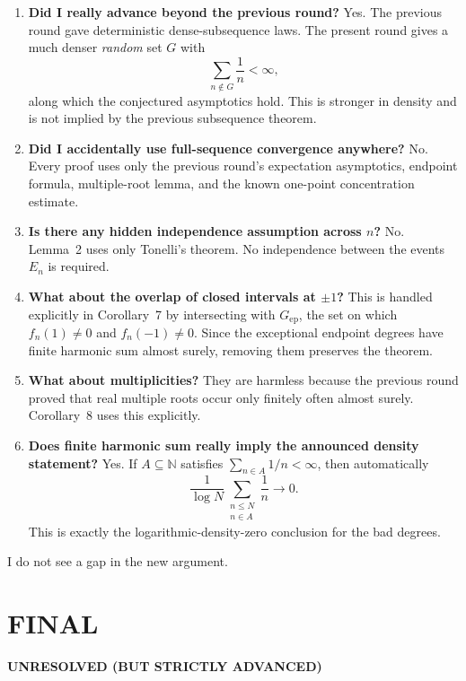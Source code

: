 \begin{enumerate}
\item \textbf{Did I really advance beyond the previous round?} Yes. The previous round gave deterministic dense-subsequence laws. The present round gives a much denser \emph{random} set $G$ with
\[
\sum_{n\notin G}\frac1n<\infty,
\]
along which the conjectured asymptotics hold. This is stronger in density and is not implied by the previous subsequence theorem.

\item \textbf{Did I accidentally use full-sequence convergence anywhere?} No. Every proof uses only the previous round's expectation asymptotics, endpoint formula, multiple-root lemma, and the known one-point concentration estimate.

\item \textbf{Is there any hidden independence assumption across $n$?} No. Lemma~2 uses only Tonelli's theorem. No independence between the events $E_n$ is required.

\item \textbf{What about the overlap of closed intervals at $\pm1$?} This is handled explicitly in Corollary~7 by intersecting with $G_{\mathrm{ep}}$, the set on which $f_n(1)\neq0$ and $f_n(-1)\neq0$. Since the exceptional endpoint degrees have finite harmonic sum almost surely, removing them preserves the theorem.

\item \textbf{What about multiplicities?} They are harmless because the previous round proved that real multiple roots occur only finitely often almost surely. Corollary~8 uses this explicitly.

\item \textbf{Does finite harmonic sum really imply the announced density statement?} Yes. If $A\subseteq\mathbb N$ satisfies $\sum_{n\in A}1/n<\infty$, then automatically
\[
\frac{1}{\log N}\sum_{\substack{n\le N\\ n\in A}}\frac1n\to0.
\]
This is exactly the logarithmic-density-zero conclusion for the bad degrees.
\end{enumerate}

I do not see a gap in the new argument.

\section{FINAL}

\textbf{UNRESOLVED (BUT STRICTLY ADVANCED)}

